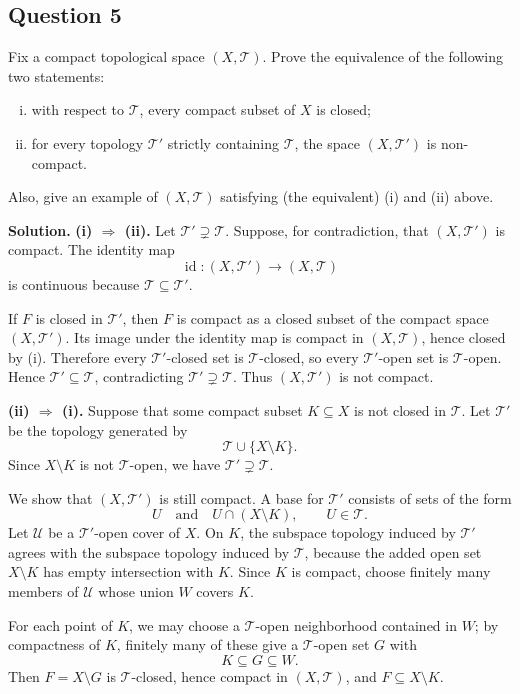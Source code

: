 \documentclass{article}
\newenvironment{solution}{\par\noindent\textbf{Solution.}\quad}{\par}
\begin{document}
\subsection{Question 5}
Fix a compact topological space $(X, \mathcal{T})$. Prove the equivalence of the following two statements:
\begin{enumerate}[(i)]
  \item with respect to $\mathcal{T}$, every compact subset of $X$ is closed;
  \item for every topology $\mathcal{T}'$ strictly containing $\mathcal{T}$, the space $(X, \mathcal{T}')$ is non-compact.
\end{enumerate}
Also, give an example of $(X, \mathcal{T})$ satisfying (the equivalent) (i) and (ii) above.

\begin{solution}
\textbf{(i) $\Rightarrow$ (ii).}
Let $\mathcal T'\supsetneq\mathcal T$. Suppose, for contradiction, that
$(X,\mathcal T')$ is compact. The identity map
\[
  \operatorname{id}:(X,\mathcal T')\to(X,\mathcal T)
\]
is continuous because $\mathcal T\subseteq\mathcal T'$.

If $F$ is closed in $\mathcal T'$, then $F$ is compact as a closed subset
of the compact space $(X,\mathcal T')$. Its image under the identity map is
compact in $(X,\mathcal T)$, hence closed by (i). Therefore every
$\mathcal T'$-closed set is $\mathcal T$-closed, so every $\mathcal T'$-open
set is $\mathcal T$-open. Hence $\mathcal T'\subseteq\mathcal T$,
contradicting $\mathcal T'\supsetneq\mathcal T$. Thus $(X,\mathcal T')$ is
not compact.

\textbf{(ii) $\Rightarrow$ (i).}
Suppose that some compact subset $K\subseteq X$ is not closed in
$\mathcal T$. Let $\mathcal T'$ be the topology generated by
\[
  \mathcal T\cup\{X\setminus K\}.
\]
Since $X\setminus K$ is not $\mathcal T$-open, we have
$\mathcal T'\supsetneq\mathcal T$.

We show that $(X,\mathcal T')$ is still compact. A base for
$\mathcal T'$ consists of sets of the form
\[
  U\quad\text{and}\quad U\cap(X\setminus K),
  \qquad U\in\mathcal T.
\]
Let $\mathcal U$ be a $\mathcal T'$-open cover of $X$. On $K$, the
subspace topology induced by $\mathcal T'$ agrees with the subspace
topology induced by $\mathcal T$, because the added open set
$X\setminus K$ has empty intersection with $K$. Since $K$ is compact,
choose finitely many members of $\mathcal U$ whose union $W$ covers $K$.

For each point of $K$, we may choose a $\mathcal T$-open neighborhood
contained in $W$; by compactness of $K$, finitely many of these give a
$\mathcal T$-open set $G$ with
\[
  K\subseteq G\subseteq W.
\]
Then $F=X\setminus G$ is $\mathcal T$-closed, hence compact in
$(X,\mathcal T)$, and $F\subseteq X\setminus K$.


\end{solution}
\end{document}
